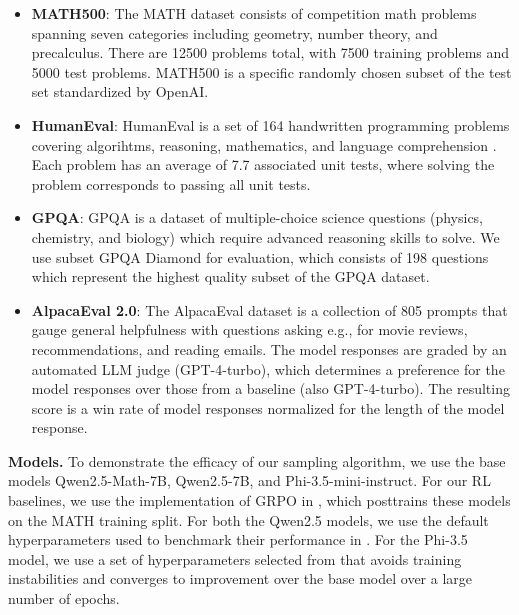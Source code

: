 \documentclass{article}
\renewcommand{\paragraph}[1]{\vspace{.1em}\noindent\textbf{#1}}
\begin{document}
\begin{itemize}[leftmargin=*, , nosep]
    \item {\textbf{MATH500}}: The {MATH} dataset \citep{lightman2024lets} consists of competition math problems spanning seven categories including geometry, number theory, and precalculus. There are 12500 problems total, with 7500 training problems and 5000 test problems. {MATH500} is a specific randomly chosen subset of the test set standardized by OpenAI.


    \item \textbf{HumanEval}: HumanEval is a set of 164 handwritten programming problems covering algorihtms, reasoning, mathematics, and language comprehension \citep{chen2021evaluatingllmcode}. Each problem has an average of 7.7 associated unit tests, where solving the problem corresponds to passing all unit tests.


    \item {\textbf{GPQA}}: GPQA \citep{rein2024gpqa} is a dataset of multiple-choice science questions (physics, chemistry, and biology) which require advanced reasoning skills to solve. We use  subset GPQA Diamond for evaluation, which consists of 198 questions which represent the highest quality subset of the GPQA dataset.


    \item \textbf{AlpacaEval 2.0}: The AlpacaEval dataset is a collection of 805 prompts \citep{dubois2024lengthcontrolledalpacaeval} that gauge general helpfulness with questions asking e.g., for movie reviews, recommendations, and reading emails. The model responses are graded by an automated LLM judge (GPT-4-turbo), which determines a preference for the model responses over those from a baseline (also GPT-4-turbo). The resulting score is a win rate of model responses normalized for the length of the model response.
\end{itemize}


\paragraph{Models.} To demonstrate the efficacy of our sampling algorithm, we use the base models Qwen2.5-Math-7B, Qwen2.5-7B, and Phi-3.5-mini-instruct. For our RL baselines, we use the implementation of GRPO in \cite{shao2025spuriousrewards}, which posttrains these models on the MATH training split. For both the Qwen2.5 models, we use the default hyperparameters used to benchmark their performance in \cite{shao2025spuriousrewards}. For the Phi-3.5 model, we use a set of hyperparameters selected from \cite{abdin2024phi4} that avoids training instabilities and converges to improvement over the base model over a large number of epochs. 
\end{document}
